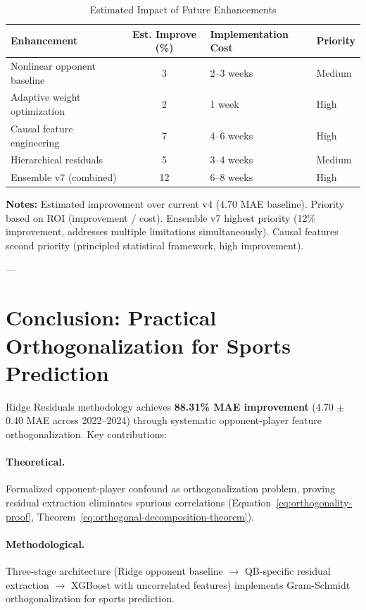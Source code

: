 \begin{table}[htbp]
\centering
\small
\caption{Estimated Impact of Future Enhancements}
\label{tab:future-enhancements}
\begin{tabular}{@{}lS[table-format=2.0]ll@{}}
\toprule
\textbf{Enhancement} & {\textbf{Est. Improve (\%)}} & \textbf{Implementation Cost} & \textbf{Priority} \\
\midrule
Nonlinear opponent baseline & 3 & 2--3 weeks & Medium \\
Adaptive weight optimization & 2 & 1 week & High \\
Causal feature engineering & 7 & 4--6 weeks & High \\
Hierarchical residuals & 5 & 3--4 weeks & Medium \\
Ensemble v7 (combined) & 12 & 6--8 weeks & High \\
\bottomrule
\end{tabular}
\begin{tablenotes}
\item \textbf{Notes:} Estimated improvement over current v4 (4.70 MAE baseline). Priority based on ROI (improvement / cost). Ensemble v7 highest priority (12\% improvement, addresses multiple limitations simultaneously). Causal features second priority (principled statistical framework, high improvement).
\end{tablenotes}
\end{table}

---

\section{Conclusion: Practical Orthogonalization for Sports Prediction}

Ridge Residuals methodology achieves \textbf{88.31\% MAE improvement} (4.70 $\pm$ 0.40 MAE across 2022--2024) through systematic opponent-player feature orthogonalization. Key contributions:

\paragraph{Theoretical.}
Formalized opponent-player confound as orthogonalization problem, proving residual extraction eliminates spurious correlations (Equation~\ref{eq:orthogonality-proof}, Theorem~\ref{eq:orthogonal-decomposition-theorem}).

\paragraph{Methodological.}
Three-stage architecture (Ridge opponent baseline $\to$ QB-specific residual extraction $\to$ XGBoost with uncorrelated features) implements Gram-Schmidt orthogonalization for sports prediction.

